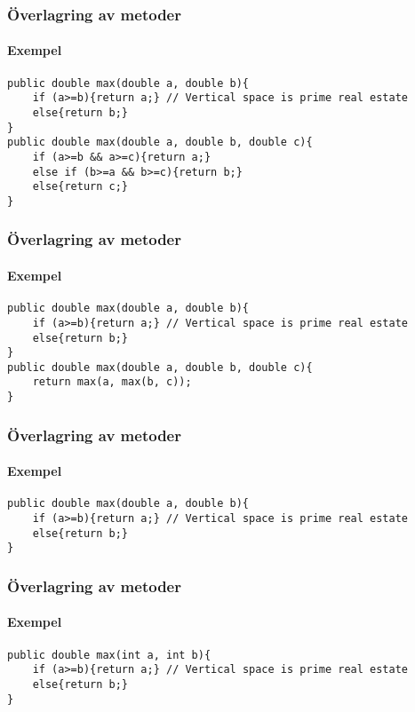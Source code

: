 \documentclass[aspectratio=169]{beamer}
\begin{document}
\begin{frame}[fragile]
    \frametitle{Överlagring av metoder}
    \framesubtitle{Exempel}

    \begin{lstlisting}
public double max(double a, double b){
    if (a>=b){return a;} // Vertical space is prime real estate
    else{return b;}
}
public double max(double a, double b, double c){
    if (a>=b && a>=c){return a;}
    else if (b>=a && b>=c){return b;}
    else{return c;}
}
    \end{lstlisting}


\end{frame}

\begin{frame}[fragile]
    \frametitle{Överlagring av metoder}
    \framesubtitle{Exempel}

    \begin{lstlisting}
public double max(double a, double b){
    if (a>=b){return a;} // Vertical space is prime real estate
    else{return b;}
}
public double max(double a, double b, double c){
    return max(a, max(b, c));
}
    \end{lstlisting}


\end{frame}

\begin{frame}[fragile]
    \frametitle{Överlagring av metoder}
    \framesubtitle{Exempel}

    \begin{lstlisting}
public double max(double a, double b){
    if (a>=b){return a;} // Vertical space is prime real estate
    else{return b;}
}
    \end{lstlisting}


\end{frame}

\begin{frame}[fragile]
    \frametitle{Överlagring av metoder}
    \framesubtitle{Exempel}


    \begin{lstlisting}
public double max(int a, int b){
    if (a>=b){return a;} // Vertical space is prime real estate
    else{return b;}
}
    \end{lstlisting}

\end{frame}
\end{document}

